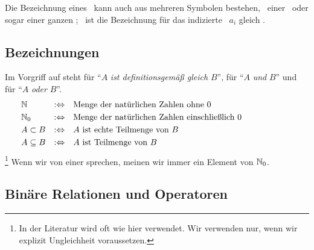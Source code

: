 Die Bezeichnung eines \Objekts\ kann auch aus mehreren Symbolen bestehen, \textdh\ einer \Zeichenfolge\ oder sogar einer ganzen \Formel; \textzB\ ist die Bezeichnung für das indizierte \Objekt\ $a_i$ gleich .

\subsection{Bezeichnungen}%
\label{sub:Bezeichnungen}

Im Vorgriff auf  steht  für \enquote{$A$ \emph{ist definitionsgemäß gleich} $B$},  für \enquote{$A$ \emph{und} $B$} und  für \enquote{$A$ \emph{oder} $B$}.
\begin{align}
	& \mathbb{N}          & :\Leftrightarrow & \quad
	\text{Menge der natürlichen Zahlen ohne           $0$} \\
	& \mathbb{N}_0         & :\Leftrightarrow & \quad
	\text{Menge der natürlichen Zahlen einschließlich $0$} \\
	& A \subset B   & :\Leftrightarrow & \quad
	\text{$A$ ist echte Teilmenge von $B$}                 \\
	& A \subseteq B & :\Leftrightarrow & \quad
	\text{$A$ ist       Teilmenge von $B$}                 &&&&&&&&&&
\end{align}%
\footnote{%
	In der Literatur wird \chrqt{$\subset$} oft wie hier \chrqt{$\subseteq$} verwendet.
	Wir verwenden \chrqt{$\subset$} nur, wenn wir explizit Ungleichheit voraussetzen.
}
Wenn wir von einer  sprechen, meinen wir immer ein Element von $\mathbb{N}_0$.

\subsection{Binäre Relationen und Operatoren}%
\label{sub:binär}

